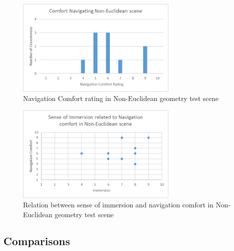 			\begin{figure}
				\label{exp:fig:ne_comfort}
				\includegraphics[width=0.7\textwidth]{Images/NE_Comfort}
				\centering
				\caption{Navigation Comfort rating in Non-Euclidean geometry test scene}
			\end{figure}

			\begin{figure}
				\label{exp:fig:ne_relation}
				\includegraphics[width=0.7\textwidth]{Images/NE_Relation}
				\centering
				\caption{Relation between sense of immersion and navigation comfort in Non-Euclidean geometry test scene}
			\end{figure}

		\subsection{Comparisons}
		\label{exp:exp:comp}


